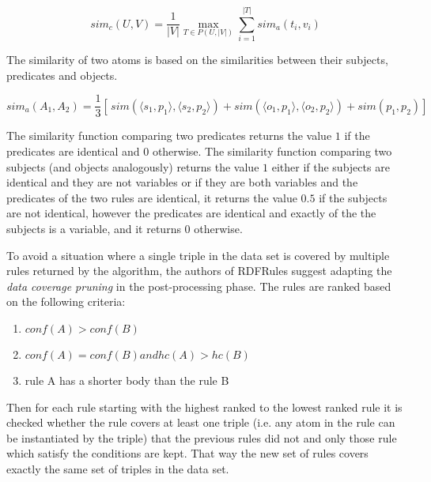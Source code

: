$$sim_{c}(U,V) = \dfrac{1}{|V|} \max\limits_{T\in P(U,|V|)}\sum_{i = 1}^{|T|} sim_{a}(t_{i},v_{i})$$

The similarity of two atoms is based on the similarities between their subjects, predicates and objects.

$$sim_a(A_{1}, A_{2}) = \frac{1}{3} [ \, sim(\langle s_{1}, p_{1} \rangle, \langle s_{2}, p_{2} \rangle) + sim(\langle o_{1}, p_{1} \rangle, \langle o_{2}, p_{2} \rangle) + sim(p_{1}, p_{2}) ] \,$$

The similarity function comparing two predicates returns the value $1$ if the predicates are identical and $0$ otherwise. The similarity function comparing two subjects (and objects analogously) returns the value $1$ either if the subjects are identical and they are not variables or if they are both variables and the predicates of the two rules are identical, it returns the value $0.5$ if the subjects are not identical, however the predicates are identical and exactly of the the subjects is a variable, and it returns $0$ otherwise.

To avoid a situation where a single triple in the data set is covered by multiple rules returned by the algorithm, the authors of RDFRules suggest adapting the \textit{data coverage pruning} in the post-processing phase. The rules are ranked based on the following criteria:

\begin{enumerate}
    \item $conf(A) > conf(B)$
    \item $conf(A) = conf(B) and hc(A) > hc(B)$
    \item rule A has a shorter body than the rule B
\end{enumerate}

Then for each rule starting with the highest ranked to the lowest ranked rule it is checked whether the rule covers at least one triple (i.e. any atom in the rule can be instantiated by the triple) that the previous rules did not and only those rule which satisfy the conditions are kept. That way the new set of rules covers exactly the same set of triples in the data set.